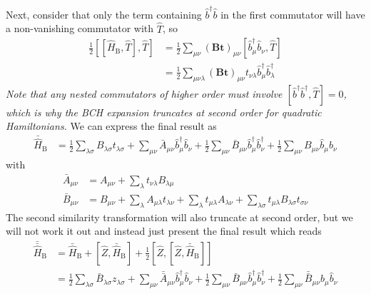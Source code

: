 Next, consider that only the term containing $\hat{b}^\dagger \hat{b}$ in the first commutator will have a non-vanishing commutator with $\hat{T}$, so 
\begin{align}
	\frac{1}{2} [[\hat{H}_{\mathrm{B}}, \hat{T}], \hat{T}] 
	& = \frac{1}{2} \sum_{\mu\nu} (\mathbf{Bt})_{\mu\nu} [\hat{b}^\dagger_\mu \hat{b}_\nu, \hat{T}] \\
	& = \frac{1}{2} \sum_{\mu\nu\lambda} (\mathbf{Bt})_{\mu\nu} t_{\nu\lambda} \hat{b}^\dagger_\mu \hat{b}^\dagger_\lambda
\end{align}
\emph{Note that any nested commutators of higher order must involve $[\hat{b}^\dagger \hat{b}^\dagger, \hat{T}]=0$, which is why the BCH expansion truncates at second order for quadratic Hamiltonians.}
We can express the final result as
\begin{equation} \label{eq:bH_B}
\begin{split}
	\bar{\hat{H}}_{\mathrm{B}} 
	& = \frac{1}{2} \sum_{\lambda \sigma} B_{\lambda \sigma} t_{\lambda \sigma} + \sum_{\mu \nu} \bar{A}_{\mu \nu} \hat{b}^\dagger_{\mu} \hat{b}_{\nu}  + \frac{1}{2} \sum_{\mu \nu} \bar{B}_{\mu \nu} \hat{b}^\dagger_{\mu} \hat{b}^\dagger_{\nu} + \frac{1}{2} \sum_{\mu \nu} B_{\mu \nu} \hat{b}_{\mu} \hat{b}_{\nu} 
\end{split}
\end{equation}
with
\begin{subequations}
\begin{align}
	\bar{A}_{\mu \nu} & 
	= A_{\mu \nu}
	+ \sum_{\lambda}  t_{\nu \lambda} B_{\lambda \mu}
	\\
	\bar{B}_{\mu \nu} & 
	= B_{\mu \nu} + \sum_{\lambda} A_{\mu \lambda} t_{\lambda \nu} 
	+ \sum_\lambda t_{\mu \lambda} A_{\lambda \nu} 
	+ \sum_{\lambda \sigma} t_{\mu \lambda } B_{\lambda \sigma} t_{\sigma \nu}
\end{align}
\end{subequations}
 The second similarity transformation will also truncate at second order, but we will not work it out and instead just present the final result which reads
\begin{equation} \label{eq:bbH_B}
\begin{split}
	\bar{\bar{\hat{H}}}_{\mathrm{B}} 
	& = \bar{\hat{H}}_{\mathrm{B}} + [\hat{Z}, \bar{\hat{H}}_{\mathrm{B}}] + \frac{1}{2} [\hat{Z}, [\hat{Z}, \bar{\hat{H}}_{\mathrm{B}}]]
	\\ 
	&\boxed{ = \frac{1}{2} \sum_{\lambda \sigma} \bar{B}_{\lambda \sigma} z_{\lambda \sigma}
	+ \sum_{\mu \nu} \bar{\bar{A}}_{\mu \nu} \hat{b}^\dagger_{\mu} \hat{b}_{\nu}  + \frac{1}{2} \sum_{\mu \nu} \bar{B}_{\mu \nu} \hat{b}^\dagger_{\mu} \hat{b}^\dagger_{\nu} 
	+ \frac{1}{2} \sum_{\mu \nu} \bar{\bar{B}}_{\mu \nu} \hat{b}_{\mu} \hat{b}_{\nu} }
\end{split}
\end{equation}
